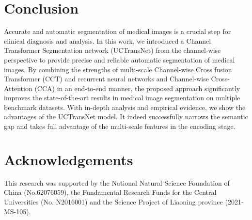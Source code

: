 \documentclass[letterpaper]{article} \usepackage{aaai22}  \usepackage{times}  \usepackage{helvet}  \usepackage{courier}  \usepackage[hyphens]{url}  \usepackage{graphicx} \urlstyle{rm} \def\UrlFont{\rm}  \usepackage{natbib}  \usepackage{caption} \DeclareCaptionStyle{ruled}{labelfont=normalfont,labelsep=colon,strut=off} \frenchspacing  \setlength{\pdfpagewidth}{8.5in}  \setlength{\pdfpageheight}{11in}  \usepackage{algorithm}
\begin{document}
	
	
	
	\section{Conclusion}
	Accurate and automatic segmentation of medical images is a crucial step for clinical diagnosis and analysis.
	In this work, we introduced a Channel Transformer Segmentation network (UCTransNet) from the channel-wise perspective to provide precise and reliable automatic segmentation of medical images.
	By combining the strengths of multi-scale Channel-wise Cross fusion Transformer (CCT) and recurrent neural networks and Channel-wise Cross-Attention (CCA) in an end-to-end manner, the proposed approach significantly improves the state-of-the-art results in medical image segmentation on multiple benchmark datasets.
	With in-depth analysis and empirical evidence, we show the advantages of the UCTransNet model. It indeed successfully narrows the semantic gap and takes full advantage of the multi-scale features in the encoding stage.
	
	
	
	\section{Acknowledgements}
	This research was supported by the National Natural Science Foundation of China (No.62076059), the Fundamental Research Funds for the Central Universities (No. N2016001) and the Science Project of Liaoning province (2021-MS-105).
	
	
	
	
	
\end{document}
